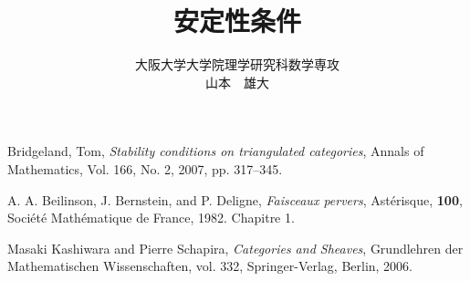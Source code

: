 \documentclass[eqno]{ltjsarticle}
\begin{document}
\title{安定性条件}
\date{}
\author{大阪大学大学院理学研究科数学専攻\\山本　雄大}
\maketitle
\tableofcontents




\begin{thebibliography}{99}
	Bridgeland, Tom,
		\textit{Stability conditions on triangulated categories},
	Annals of Mathematics, Vol. 166, No. 2, 2007, pp. 317–345.

	A. A. Beilinson, J. Bernstein, and P. Deligne,
	\textit{Faisceaux pervers},
	Astérisque, \textbf{100}, Société Mathématique de France, 1982. Chapitre 1.

	Masaki Kashiwara and Pierre Schapira,
	\textit{Categories and Sheaves},
	Grundlehren der Mathematischen Wissenschaften, vol. 332,
	Springer-Verlag, Berlin, 2006.

\end{thebibliography}
\end{document}
